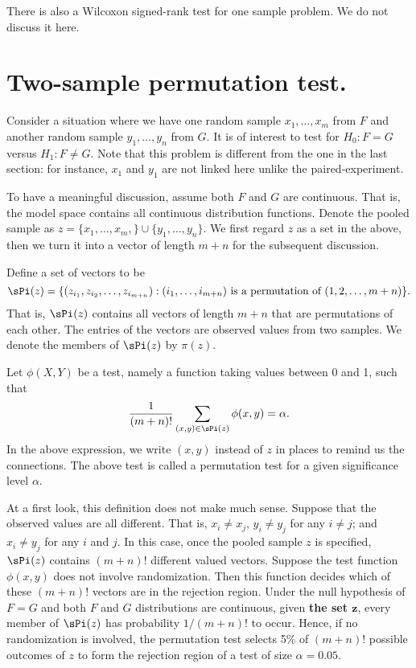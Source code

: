 There is also a Wilcoxon signed-rank test for one sample problem.
We do not discuss it here.

\section{Two-sample permutation test.}

Consider a situation where we have one random sample $x_1, \ldots, x_m$
from $F$ and another random sample $y_1, \ldots, y_n$ from $G$.
It is of interest to test for $H_0: F = G$ versus $H_1: F \neq G$.
Note that this problem is different from the one in the last section:
for instance, $x_1$ and $y_1$ are not linked here unlike the paired-experiment.

To have a meaningful discussion, assume both $F$ and $G$ are continuous.
That is, the model space contains all continuous distribution functions.
Denote the pooled sample as 
$z = \{ x_1, \ldots, x_m, \}\cup \{y_1, \ldots, y_n\}$.
We first regard $z$ as a set in the above, then we turn it into a vector of length $m+n$
for the subsequent discussion.

Define a set of vectors to be
\[
\sPi(z) 
= 
\{ (z_{i_1}, z_{i_2}, \ldots, z_{i_{m+n}}): (i_1, \ldots, i_{m+n}) 
\mbox{ is a permutation of }
(1, 2, \ldots, m+n)\}.
\]
That is, $\sPi(z)$ contains all vectors of length $m+n$ 
that are permutations of each other. The entries of the vectors
are observed values from two samples.
We denote the members of $\sPi(z)$ by $\pi(z)$.

Let $\phi(X, Y)$ be a test, namely a function taking values between 0 and 1, 
such that 
\[
\frac{1}{(m+n)!} \sum_{(x, y) \in \sPi(z)} \phi(x, y) = \alpha.
\]
In the above expression, we write $(x, y)$ instead of $z$ in places
to remind us the connections. 
The above test is called a permutation test for a given significance level $\alpha$.

At a first look, this definition does not make much sense.
Suppose that the observed values are all different.
That is, $x_i \neq x_j$, $y_i \neq y_j$ for any $i \neq j$;
and $x_i \neq y_j$ for any $i$ and $j$.
In this case, once the pooled sample $z$ is specified,
$\sPi(z)$ contains $(m+n)!$ different valued vectors.
Suppose the test function $\phi(x, y)$ does not involve randomization. 
Then this function decides which of these $(m+n)!$ vectors are in the rejection region.
Under the null hypothesis of $F = G$ and both $F$ and $G$ distributions
are continuous, given {\bf the set $\mathbf z$}, every member
of $\sPi(z)$ has probability $1/(m+n)!$ to occur.
Hence, if no randomization is involved,
the permutation test selects 5\% of $(m+n)!$ possible outcomes of $z$
to form the rejection region of a test of size $\alpha = 0.05$. 

